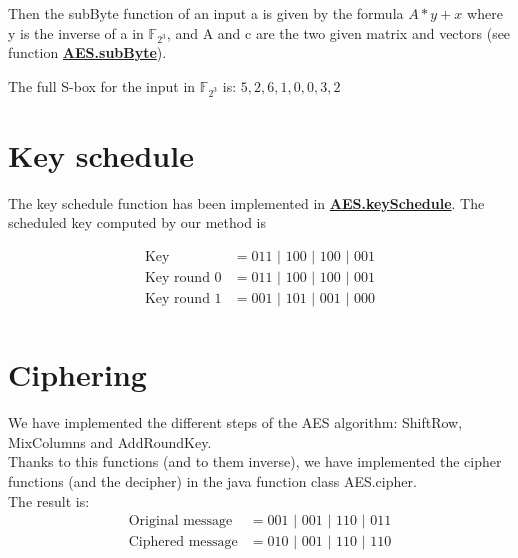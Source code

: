 \documentclass[12pt]{article} %
\begin{document}
Then the subByte function of an input a is given by the formula $A * y + x$ where y is the inverse of a in $\mathbb{F}_{2^3}$, and A and c are the two given matrix and vectors (see function \textbf{\underline{AES.subByte}}).

The full S-box for the input in $\mathbb{F}_{2^3}$ is: ${5, 2, 6, 1, 0, 0, 3, 2}$

\section{Key schedule}
The key schedule function has been implemented in \textbf{\underline{AES.keySchedule}}.   The scheduled key computed by our method is

\begin{equation}
\begin{aligned}
	\mbox{Key}			&= 0 1 1\mbox{   |   }1 0 0\mbox{   |   }1 0 0\mbox{   |   }0 0 1\\
    \mbox{Key round 0}	&= 0 1 1\mbox{   |   }1 0 0\mbox{   |   }1 0 0\mbox{   |   }0 0 1\\
    \mbox{Key round 1}	&= 0 0 1\mbox{   |   }1 0 1\mbox{   |   }0 0 1\mbox{   |   }0 0 0\\
\end{aligned}
\end{equation}





\section{Ciphering}
We have implemented the different steps of the AES algorithm: ShiftRow, MixColumns and AddRoundKey.\\
Thanks to this functions (and to them inverse), we have implemented the cipher functions (and the decipher) in the java function class AES.cipher.\\
The result is:
\begin{equation}
\begin{aligned}
	\mbox{Original message} &= 001 \mbox{  |  } 001 \mbox{  |  } 110 \mbox{  |  } 011\\ 
	\mbox{Ciphered message} &= 010 \mbox{  |  } 001 \mbox{  |  } 110 \mbox{  |  } 110\\ 
\end{aligned}
\end{equation}
\end{document}
